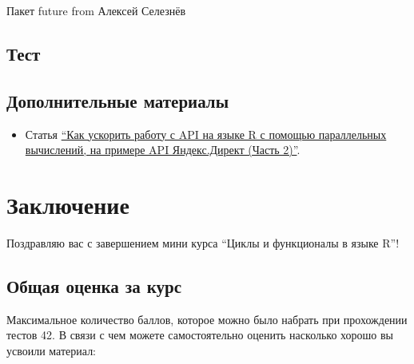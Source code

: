 \documentclass[
]{book}
\providecommand{\tightlist}{%
  \setlength{\itemsep}{0pt}\setlength{\parskip}{0pt}}
\begin{document}
Пакет future from Алексей Селезнёв

\hypertarget{ux442ux435ux441ux442-6}{%
\section{Тест}\label{ux442ux435ux441ux442-6}}

\hypertarget{ux434ux43eux43fux43eux43bux43dux438ux442ux435ux43bux44cux43dux44bux435-ux43cux430ux442ux435ux440ux438ux430ux43bux44b-3}{%
\section{Дополнительные материалы}\label{ux434ux43eux43fux43eux43bux43dux438ux442ux435ux43bux44cux43dux44bux435-ux43cux430ux442ux435ux440ux438ux430ux43bux44b-3}}

\begin{itemize}
\tightlist
\item
  Статья \href{https://habr.com/ru/post/448404/}{``Как ускорить работу с API на языке R с помощью параллельных вычислений, на примере API Яндекс.Директ (Часть 2)''}.
\end{itemize}

\hypertarget{ux437ux430ux43aux43bux44eux447ux435ux43dux438ux435}{%
\chapter*{Заключение}\label{ux437ux430ux43aux43bux44eux447ux435ux43dux438ux435}}

Поздравляю вас с завершением мини курса ``Циклы и функционалы в языке R''!

\hypertarget{ux43eux431ux449ux430ux44f-ux43eux446ux435ux43dux43aux430-ux437ux430-ux43aux443ux440ux441}{%
\section*{Общая оценка за курс}\label{ux43eux431ux449ux430ux44f-ux43eux446ux435ux43dux43aux430-ux437ux430-ux43aux443ux440ux441}}

Максимальное количество баллов, которое можно было набрать при прохождении тестов 42. В связи с чем можете самостоятельно оценить насколько хорошо вы усвоили материал:
\end{document}

